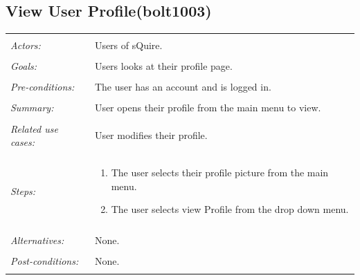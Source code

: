 \documentclass[11pt]{report}
\begin{document}
\subsection{View User Profile(bolt1003)}
\begin{tabular}{ p{2cm} p{12cm} }
 \hline
 \\
 \textit{Actors:} & Users of sQuire. \\ 
 \\
 \textit{Goals:} & Users looks at their profile page. \\
 \\
 \textit{Pre-conditions:} & The user has an account and is logged in. \\
 \\
 \textit{Summary:} & User opens their profile from the main menu to view.\\ 
 \\
 \textit{Related use cases:} & User modifies their profile. \\ 
 \\
 \textit{Steps:} & \begin{enumerate}
  \item The user selects their profile picture from the main menu.
  \item The user selects view Profile from the drop down menu.
 \end{enumerate} \\
 \\
 \textit{Alternatives:} & None. \\
 \\
 \textit{Post-conditions:} & None. \\
 \\
\hline
\end{tabular}
\end{document}
